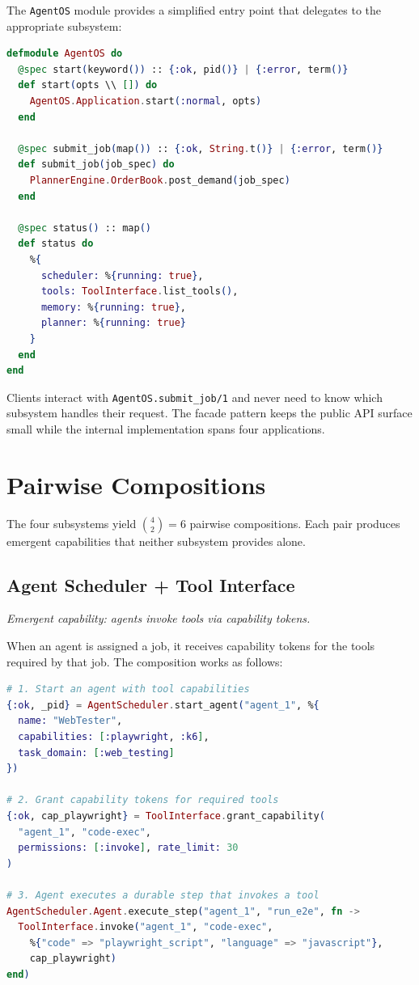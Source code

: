 \documentclass[12pt,a4paper]{article}
\theoremstyle{definition}
\begin{document}
The \texttt{AgentOS} module provides a simplified entry point that delegates
to the appropriate subsystem:

\begin{lstlisting}[language=elixir, caption={AgentOS facade module}]
defmodule AgentOS do
  @spec start(keyword()) :: {:ok, pid()} | {:error, term()}
  def start(opts \\ []) do
    AgentOS.Application.start(:normal, opts)
  end

  @spec submit_job(map()) :: {:ok, String.t()} | {:error, term()}
  def submit_job(job_spec) do
    PlannerEngine.OrderBook.post_demand(job_spec)
  end

  @spec status() :: map()
  def status do
    %{
      scheduler: %{running: true},
      tools: ToolInterface.list_tools(),
      memory: %{running: true},
      planner: %{running: true}
    }
  end
end
\end{lstlisting}

Clients interact with \texttt{AgentOS.submit\_job/1} and never need to know
which subsystem handles their request. The facade pattern keeps the public
API surface small while the internal implementation spans four applications.


\section{Pairwise Compositions}\label{sec:pairwise}

The four subsystems yield $\binom{4}{2} = 6$ pairwise compositions.
Each pair produces emergent capabilities that neither subsystem provides alone.

\subsection{Agent Scheduler + Tool Interface}\label{subsec:agent-tool}

\emph{Emergent capability: agents invoke tools via capability tokens.}

When an agent is assigned a job, it receives capability tokens for the tools
required by that job. The composition works as follows:

\begin{lstlisting}[language=elixir, caption={Agent invoking a tool via capability}]
# 1. Start an agent with tool capabilities
{:ok, _pid} = AgentScheduler.start_agent("agent_1", %{
  name: "WebTester",
  capabilities: [:playwright, :k6],
  task_domain: [:web_testing]
})

# 2. Grant capability tokens for required tools
{:ok, cap_playwright} = ToolInterface.grant_capability(
  "agent_1", "code-exec",
  permissions: [:invoke], rate_limit: 30
)

# 3. Agent executes a durable step that invokes a tool
AgentScheduler.Agent.execute_step("agent_1", "run_e2e", fn ->
  ToolInterface.invoke("agent_1", "code-exec",
    %{"code" => "playwright_script", "language" => "javascript"},
    cap_playwright)
end)
\end{lstlisting}
\end{document}
